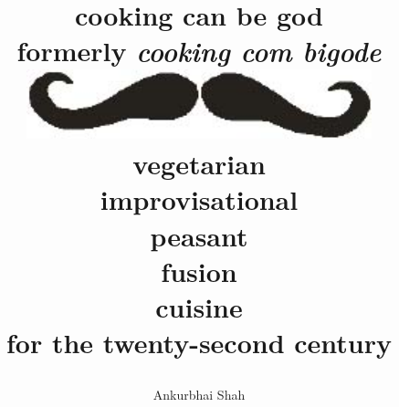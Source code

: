 
\title{\textbf{
  \Huge{cooking can be god}\\
  \smallskip
  \large{formerly \textit{cooking com bigode}}\\
  \bigskip
  \bigskip
  \includegraphics[width=10cm]{bigode.jpg}\\ 
  \bigskip
  \bigskip
  \bigskip        
  \bigskip
  \bigskip
  \bigskip        
  \Large{vegetarian\\
  improvisational\\
  peasant\\
  fusion\\
  cuisine\\
  for the twenty-second century}}
\bigskip
\bigskip     
\bigskip
\bigskip     
\bigskip
\bigskip     
\bigskip     
\bigskip
\bigskip
\bigskip
\date{}
\author{Ankurbhai Shah}}
